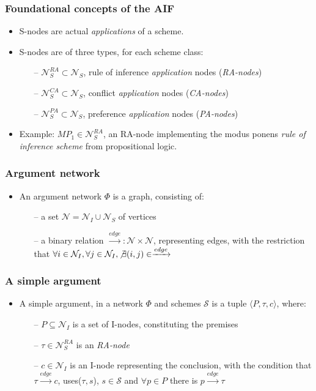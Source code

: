 \documentclass{beamer}
\begin{document}
\begin{frame}
\frametitle{Foundational concepts of the AIF}
\begin{itemize}
\item S-nodes are actual \emph{applications} of a scheme. \pause
\item S-nodes are of three types, for each scheme class: \pause
  \begin{itemize}
  \item[--] $\mathcal{N}_S^{RA} \subset \mathcal{N}_S$, rule of inference \emph{application} nodes (\emph{RA-nodes}) \pause
  \item[--] $\mathcal{N}_S^{CA} \subset \mathcal{N}_S$, conflict \emph{application} nodes (\emph{CA-nodes}) \pause
  \item[--] $\mathcal{N}_S^{PA} \subset \mathcal{N}_S$, preference \emph{application} nodes (\emph{PA-nodes}) \pause
  \end{itemize}
\item Example: $MP_1 \in \mathcal{N}_S^{RA}$, an RA-node implementing the modus ponens \emph{rule of inference scheme} from propositional logic.
\end{itemize}
\end{frame}

\begin{frame}
\frametitle{Argument network}
\begin{itemize}
\item An argument network $\Phi$ is a graph, consisting of: \pause
  \begin{itemize}
  \item[--] a set $\mathcal{N} = \mathcal{N}_I \cup \mathcal{N}_S$ of vertices \pause
  \item[--] a binary relation $\xrightarrow{edge}:\mathcal{N}\times\mathcal{N}$, representing edges, with the restriction that $\forall i \in \mathcal{N}_I, \forall j \in \mathcal{N}_I, \not\exists (i,j)\in\xrightarrow{edge}$
  \end{itemize}
\centering
\end{itemize}
\end{frame}

\begin{frame}
\frametitle{A simple argument}
\begin{itemize}
\item A simple argument, in a network $\Phi$ and schemes $\mathcal{S}$ is a tuple $\langle P, \tau, c \rangle$, where: \pause
  \begin{itemize}
  \item[--] $P \subseteq \mathcal{N}_I$ is a set of I-nodes, constituting the premises \pause
  \item[--] $\tau \in \mathcal{N}_S^{RA}$ is an \emph{RA-node} \pause
  \item[--] $c \in \mathcal{N}_I$ is an I-node representing the conclusion, with the condition that $\tau \xrightarrow{edge} c$, uses($\tau, s$), $s \in \mathcal{S}$ and $\forall p \in P$ there is $p \xrightarrow{edge} \tau$
  \end{itemize}
\end{itemize}
\end{frame}
\end{document}
